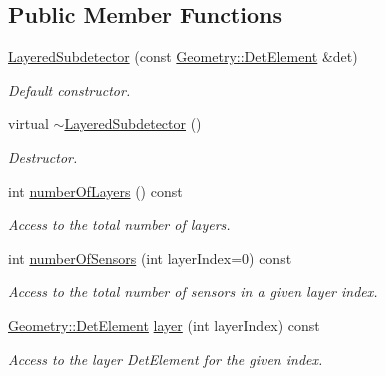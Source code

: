 \subsection*{Public Member Functions}
\begin{DoxyCompactItemize}
\item 
\hyperlink{class_d_d4hep_1_1_d_d_rec_1_1_layered_subdetector_a0897f69fe293527bc70f91840db345ea}{LayeredSubdetector} (const \hyperlink{class_d_d4hep_1_1_geometry_1_1_det_element}{Geometry::DetElement} \&det)
\begin{DoxyCompactList}\small\item\em Default constructor. \item\end{DoxyCompactList}\item 
virtual \hyperlink{class_d_d4hep_1_1_d_d_rec_1_1_layered_subdetector_a8fd9a44526c4856456d59fbb36efd6af}{$\sim$LayeredSubdetector} ()
\begin{DoxyCompactList}\small\item\em Destructor. \item\end{DoxyCompactList}\item 
int \hyperlink{class_d_d4hep_1_1_d_d_rec_1_1_layered_subdetector_adef08a11c41ecdb0595fbe4bd1bd0851}{numberOfLayers} () const 
\begin{DoxyCompactList}\small\item\em Access to the total number of layers. \item\end{DoxyCompactList}\item 
int \hyperlink{class_d_d4hep_1_1_d_d_rec_1_1_layered_subdetector_a3182cb0593f3a49c5cc10b0befffbe31}{numberOfSensors} (int layerIndex=0) const 
\begin{DoxyCompactList}\small\item\em Access to the total number of sensors in a given layer index. \item\end{DoxyCompactList}\item 
\hyperlink{class_d_d4hep_1_1_geometry_1_1_det_element}{Geometry::DetElement} \hyperlink{class_d_d4hep_1_1_d_d_rec_1_1_layered_subdetector_a3a6258cde1c1acad749e688e9e113bcb}{layer} (int layerIndex) const 
\begin{DoxyCompactList}\small\item\em Access to the layer DetElement for the given index. \item\end{DoxyCompactList}\item 

\end{DoxyCompactItemize}
